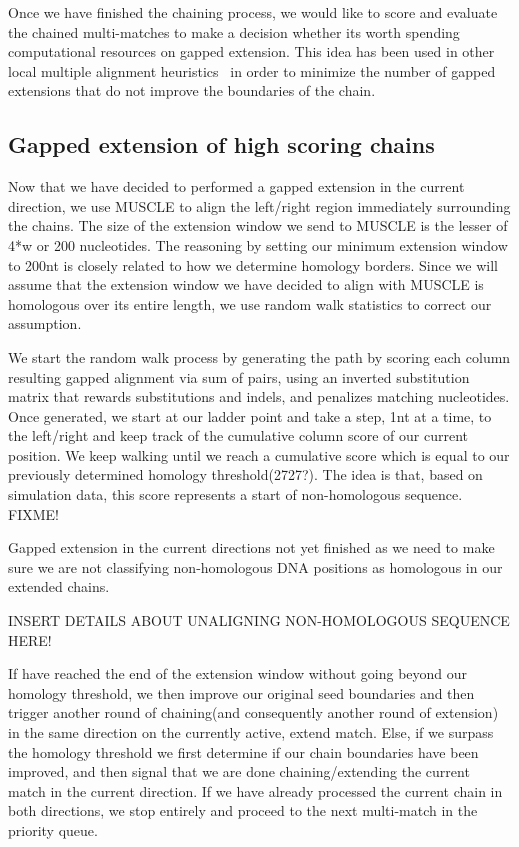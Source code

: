 \documentclass{llncs}
\begin{document}
Once we have finished the chaining process, we would like to score and evaluate the chained multi-matches to make a decision whether its worth spending computational resources on gapped extension. This idea has been used in other local multiple alignment heuristics~\cite{...} in order to minimize the number of gapped extensions that do not improve the boundaries of the chain.

\subsection{Gapped extension of high scoring chains}

Now that we have decided to performed a gapped extension in the current direction, we use MUSCLE to align the left/right region immediately surrounding the chains. The size of the extension window we send to MUSCLE is the lesser of 4*w or 200 nucleotides. The reasoning by setting our minimum extension window to 200nt is closely related to how we determine homology borders. Since we will assume that the extension window we have decided to align with MUSCLE is homologous over its entire length, we use random walk statistics to correct our assumption.

We start the random walk process by generating the path by scoring each column resulting gapped alignment via sum of pairs, using an inverted substitution matrix that rewards substitutions and indels, and penalizes matching nucleotides. Once generated, we start at our ladder point and take a step, 1nt at a time, to the left/right and keep track of the cumulative column score of our current position. We keep walking until we reach a cumulative score which is equal to our previously determined homology threshold(2727?). The idea is that, based on simulation data, this score represents a start of non-homologous sequence. FIXME!


Gapped extension in the current directions not yet finished as we need to make sure we are not classifying non-homologous DNA positions as homologous in our extended chains.

INSERT DETAILS ABOUT UNALIGNING NON-HOMOLOGOUS SEQUENCE HERE!


If have reached the end of the extension window without going beyond our homology threshold, we then improve our original seed boundaries and then trigger another round of chaining(and consequently another round of extension) in the same direction on the currently active, extend match. Else, if we surpass the homology threshold we first determine if our chain boundaries have been improved, and then signal that we are done chaining/extending the current match in the current direction. If we have already processed the current chain in both directions, we stop entirely and proceed to the next multi-match in the priority queue.
\end{document}
